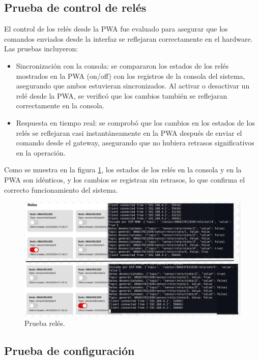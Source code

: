 \subsection{Prueba de control de relés}

El control de los relés desde la PWA fue evaluado para asegurar que los comandos enviados desde la interfaz se reflejaran correctamente en el hardware. Las pruebas incluyeron:

\begin{itemize}
    \item Sincronización con la consola: se compararon los estados de los relés mostrados en la PWA (on/off) con los registros de la consola del sistema, asegurando que ambos estuvieran sincronizados. Al activar o desactivar un relé desde la PWA, se verificó que los cambios también se reflejaran correctamente en la consola.
    
    \item Respuesta en tiempo real: se comprobó que los cambios en los estados de los relés se reflejaran casi instantáneamente en la PWA después de enviar el comando desde el gateway, asegurando que no hubiera retrasos significativos en la operación.
    
\end{itemize}

Como se muestra en la figura \ref{fig:pwa_rele}, los estados de los relés en la consola y en la PWA son idénticos, y los cambios se registran sin retrasos, lo que confirma el correcto funcionamiento del sistema.

\begin{figure}[H]
\centering 
\includegraphics[width=1\textwidth]{./Figures/pwa_rele.png}
\caption{Prueba relés.}
\label{fig:pwa_rele}
\end{figure}

\subsection{Prueba de configuración}

